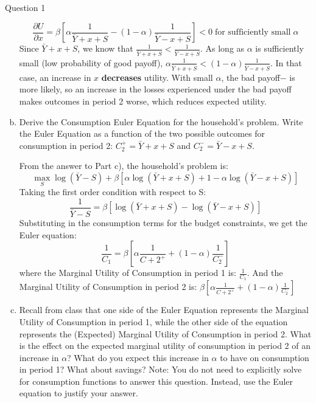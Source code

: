 \documentclass[a4paper]{article}
\begin{document}
\begin{questionbox}{Question 1}
\begin{enumerate}[(a)]
\begin{explanationbox}
				\[
					\frac{\partial U}{\partial x} = \beta \left[ \alpha\frac{1}{\bar{Y} + x + S} - (1-\alpha)\frac{1}{\bar{Y} - x + S} \right] < 0 \;\text{for sufficiently small}\; \alpha
				\]
				Since \( \bar{Y} + x + S \), we know that \( \frac{1}{\bar{Y} + x + S} < \frac{1}{\bar{Y} - x + S} \). As long as \( \alpha \) is suﬃciently small (low probability of good payoﬀ), \( \alpha\frac{1}{\bar{Y} + x + S} < (1-\alpha)\frac{1}{\bar{Y} - x + S} \). In that case, an increase in \( x \) \textbf{decreases} utility. With small \( \alpha \), the bad payoﬀ− is more likely, so an increase in the losses experienced under the bad payoﬀ makes outcomes in period 2 worse, which reduces expected utility.
			\end{explanationbox}
			\item Derive the Consumption Euler Equation for the household's problem. Write the Euler Equation as a function of the two possible outcomes for consumption in period 2: \( C_2^+ = \bar{Y} + x + S \) and \( C_2^- = \bar{Y} - x + S \).
			\begin{explanationbox}
				From the answer to Part c), the household’s problem is:
				\[
					\max_S \log (\bar{Y}- S) + \beta \left[ \alpha\log(\bar{Y} + x + S) + 1-\alpha \log(\bar{Y} - x + S) \right]
				\]
				Taking the ﬁrst order condition with respect to S:
				\[
					\frac{1}{\bar{Y}-S} = \beta\left[ \log(\bar{Y} + x + S) - \log(\bar{Y} - x + S) \right]
				\]
				Substituting in the consumption terms for the budget constraints, we get the Euler equation:
				\[
					\frac{1}{C_1} = \beta \left[ \alpha\frac{1}{C+2^+} + (1-\alpha) \frac{1}{C_2^-} \right]
				\]
				where the Marginal Utility of Consumption in period 1 is: \( \frac{1}{C_1} \). And the Marginal Utility of Consumption in period 2 is: \( \beta \left[ \alpha\frac{1}{C+2^+} + (1-\alpha) \frac{1}{C_2^-} \right] \)
			\end{explanationbox}\pagebreak
			\item Recall from class that one side of the Euler Equation represents the Marginal Utility of Consumption in period 1, while the other side of the equation represents the (Expected) Marginal Utility of Consumption in period 2. What is the eﬀect on the expected marginal utility of consumption in period 2 of an increase in \( \alpha \)? What do you expect this increase in \( \alpha \) to have on consumption in period 1? What about savings? Note: You do not need to explicitly solve for consumption functions to answer this question. Instead, use the Euler equation to justify your answer.
			\begin{explanationbox}

\end{explanationbox}
\end{enumerate}
\end{questionbox}
\end{document}
